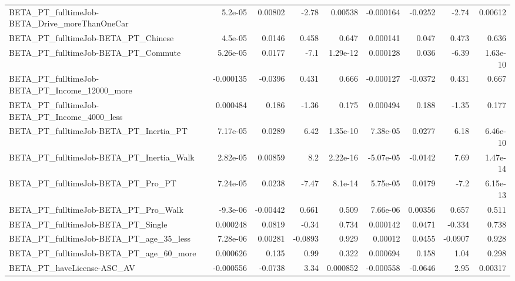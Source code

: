 \begin{tabular}{lrrrrrrrr}
BETA\_PT\_fulltimeJob-BETA\_Drive\_moreThanOneCar      &     5.2e-05 &      0.00802 &    -2.78 &  0.00538 &  -0.000164 &     -0.0252 &        -2.74 &       0.00612 \\
BETA\_PT\_fulltimeJob-BETA\_PT\_Chinese                &     4.5e-05 &       0.0146 &    0.458 &    0.647 &   0.000141 &       0.047 &        0.473 &         0.636 \\
BETA\_PT\_fulltimeJob-BETA\_PT\_Commute                &    5.26e-05 &       0.0177 &     -7.1 & 1.29e-12 &   0.000128 &       0.036 &        -6.39 &      1.63e-10 \\
BETA\_PT\_fulltimeJob-BETA\_PT\_Income\_12000\_more      &   -0.000135 &      -0.0396 &    0.431 &    0.666 &  -0.000127 &     -0.0372 &        0.431 &         0.667 \\
BETA\_PT\_fulltimeJob-BETA\_PT\_Income\_4000\_less       &    0.000484 &        0.186 &    -1.36 &    0.175 &   0.000494 &       0.188 &        -1.35 &         0.177 \\
BETA\_PT\_fulltimeJob-BETA\_PT\_Inertia\_PT             &    7.17e-05 &       0.0289 &     6.42 & 1.35e-10 &   7.38e-05 &      0.0277 &         6.18 &      6.46e-10 \\
BETA\_PT\_fulltimeJob-BETA\_PT\_Inertia\_Walk           &    2.82e-05 &      0.00859 &      8.2 & 2.22e-16 &  -5.07e-05 &     -0.0142 &         7.69 &      1.47e-14 \\
BETA\_PT\_fulltimeJob-BETA\_PT\_Pro\_PT                 &    7.24e-05 &       0.0238 &    -7.47 &  8.1e-14 &   5.75e-05 &      0.0179 &         -7.2 &      6.15e-13 \\
BETA\_PT\_fulltimeJob-BETA\_PT\_Pro\_Walk               &    -9.3e-06 &     -0.00442 &    0.661 &    0.509 &   7.66e-06 &     0.00356 &        0.657 &         0.511 \\
BETA\_PT\_fulltimeJob-BETA\_PT\_Single                 &    0.000248 &       0.0819 &    -0.34 &    0.734 &   0.000142 &      0.0471 &       -0.334 &         0.738 \\
BETA\_PT\_fulltimeJob-BETA\_PT\_age\_35\_less            &    7.28e-06 &      0.00281 &  -0.0893 &    0.929 &    0.00012 &      0.0455 &      -0.0907 &         0.928 \\
BETA\_PT\_fulltimeJob-BETA\_PT\_age\_60\_more            &    0.000626 &        0.135 &     0.99 &    0.322 &   0.000694 &       0.158 &         1.04 &         0.298 \\
BETA\_PT\_haveLicense-ASC\_AV                         &   -0.000556 &      -0.0738 &     3.34 & 0.000852 &  -0.000558 &     -0.0646 &         2.95 &       0.00317 \\

\end{tabular}
